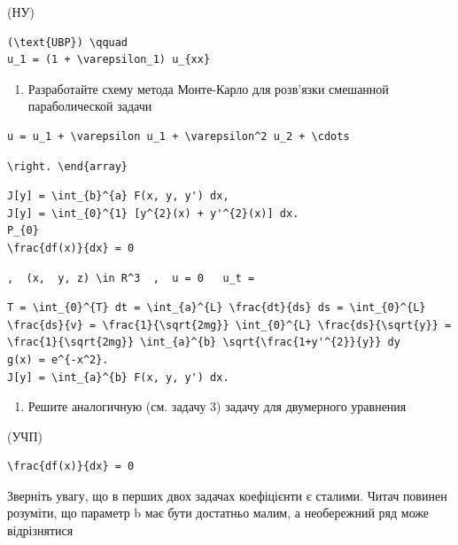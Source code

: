 \documentclass[
  ukrainian,
]{article}
\providecommand{\tightlist}{%
  \setlength{\itemsep}{0pt}\setlength{\parskip}{0pt}}
\begin{document}
(НУ)

\begin{verbatim}
(\text{UBP}) \qquad
u_1 = (1 + \varepsilon_1) u_{xx}
\end{verbatim}

\begin{enumerate}
\def\labelenumi{\arabic{enumi}.}
\setcounter{enumi}{4}
\tightlist
\item
  Разработайте схему метода Монте-Карло для розв'язки смешанной
  параболической задачи
\end{enumerate}

\begin{verbatim}
u = u_1 + \varepsilon u_1 + \varepsilon^2 u_2 + \cdots
\end{verbatim}

\begin{verbatim}
\right. \end{array}
\end{verbatim}

\begin{verbatim}
J[y] = \int_{b}^{a} F(x, y, y') dx,
J[y] = \int_{0}^{1} [y^{2}(x) + y'^{2}(x)] dx.
P_{0}
\frac{df(x)}{dx} = 0
\end{verbatim}

\begin{verbatim}
,  (x,  y, z) \in R^3  ,  u = 0   u_t =
\end{verbatim}

\begin{verbatim}
T = \int_{0}^{T} dt = \int_{a}^{L} \frac{dt}{ds} ds = \int_{0}^{L} \frac{ds}{v} = \frac{1}{\sqrt{2mg}} \int_{0}^{L} \frac{ds}{\sqrt{y}} = \frac{1}{\sqrt{2mg}} \int_{a}^{b} \sqrt{\frac{1+y'^{2}}{y}} dy
g(x) = e^{-x^2}.
J[y] = \int_{a}^{b} F(x, y, y') dx.
\end{verbatim}

\begin{enumerate}
\def\labelenumi{\arabic{enumi}.}
\setcounter{enumi}{3}
\tightlist
\item
  Решите аналогичную (см. задачу 3) задачу для двумерного уравнения
\end{enumerate}

(УЧП)

\begin{verbatim}
\frac{df(x)}{dx} = 0
\end{verbatim}

Зверніть увагу, що в перших двох задачах коефіцієнти є сталими. Читач
повинен розуміти, що параметр b має бути достатньо малим, а необережний
ряд може відрізнятися
\end{document}
